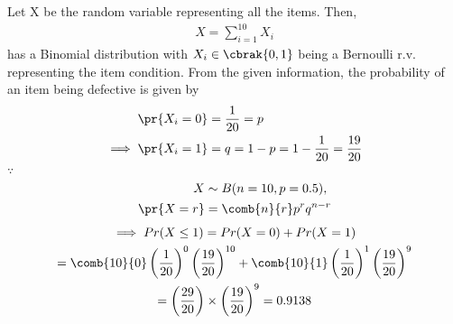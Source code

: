Let X be the random variable representing all the items.  Then,
\begin{align}
X = \sum_{i=1}^{10}X_i
\end{align}
%
has a Binomial distribution with
$X_i \in \cbrak{0,1}$ being a Bernoulli r.v. representing the item condition.  From the given information, the probability of an item being
defective is given by
\begin{align}
\pr{X_i = 0} &= \frac{1}{20} = p
\\
\implies \pr{X_i = 1} &= q = 1-p =  1-\frac{1}{20} = \frac{19}{20}
\end{align}
%
$\because$
 \begin{align}
    X &\sim B(n=10,p=0.5),
    \\
   \pr{X=r}&=    \comb{n}{r} p^r q^{n-r}
   \end{align}
\begin{multline}
\implies Pr(X \le 1)=Pr(X=0)+Pr(X=1) \\
              =\comb{10}{0}\left(\frac{1}{20}\right)^0 \left(\frac{19}{20}\right)^{10}+\comb{10}{1} \left(\frac{1}{20}\right)^1 \left(\frac{19}{20}\right)^{9}\\
              =\left(\frac{29}{20}\right) \times\left (\frac{19}{20}\right) ^{9}
              =0.9138
\end{multline} 

